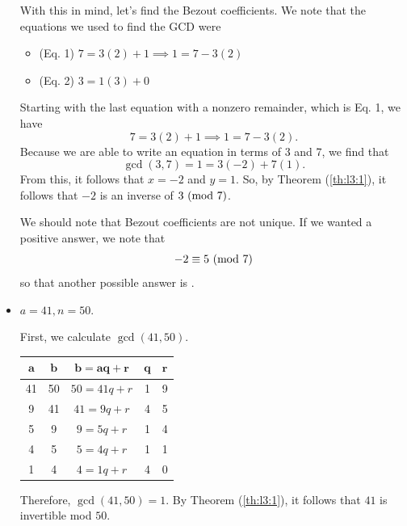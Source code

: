 \documentclass[letterpaper]{article}
\begin{document}
\begin{mdframed}
\begin{itemize}
\begin{mdframed}
            With this in mind, let's find the Bezout coefficients. We note that the equations we used to find the GCD were
            \begin{itemize}
                \item (Eq. 1) $7 = 3(2) + 1 \implies 1 = 7 - 3(2)$
                \item (Eq. 2) $3 = 1(3) + 0$
            \end{itemize}
            Starting with the last equation with a nonzero remainder, which is Eq. 1, we have 
            \[7 = 3(2) + 1 \implies 1 = 7 - 3(2).\]
            Because we are able to write an equation in terms of 3 and 7, we find that 
            \[\gcd(3, 7) = 1 = 3(-2) + 7(1).\]
            From this, it follows that $x = -2$ and $y = 1$. So, by Theorem (\ref{th:l3:1}), it follows that $-2$ is an inverse of $3 \ (\mathrm{mod}\ 7)$. 

            \bigskip 

            We should note that Bezout coefficients are not unique. If we wanted a positive answer, we note that 
            \[-2 \equiv 5 \ (\mathrm{mod}\ 7)\]
            so that another possible answer is .
        \end{mdframed}

        \item $a = 41, n = 50$.
        \begin{mdframed}
            First, we calculate $\gcd(41, 50)$. 
            \begin{center}
                \begin{tabular}{|c|c|c|c|c|}
                    \hline 
                    $\mathbf{a}$ & $\mathbf{b}$ & $\mathbf{b = aq + r}$ & $\mathbf{q}$ & $\mathbf{r}$ \\ 
                    \hline 
                    41 & 50 & $50 = 41q + r$ & 1 & 9 \\ 
                    9 & 41 & $41 = 9q + r$ & 4 & 5 \\ 
                    5 & 9 & $9 = 5q + r$ & 1 & 4 \\ 
                    4 & 5 & $5 = 4q + r$ & 1 & 1 \\ 
                    1 & 4 & $4 = 1q + r$ & 4 & 0 \\ 
                    \hline 
                \end{tabular}
            \end{center}
            Therefore, $\gcd(41, 50) = 1$. By Theorem (\ref{th:l3:1}), it follows that $41$ is invertible mod $50$.


\end{mdframed}
\end{itemize}
\end{mdframed}
\end{document}
